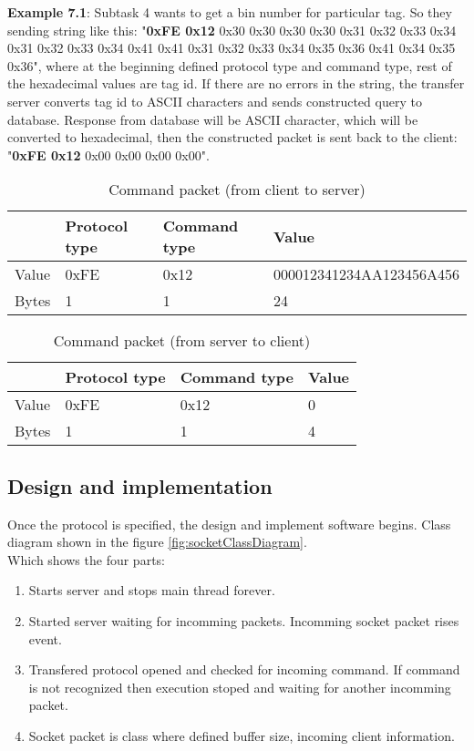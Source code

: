 \textbf{Example 7.1}: Subtask 4 wants to get a bin number for particular tag. So they sending string like this: 
"\textbf{0xFE 0x12} 0x30 0x30 0x30 0x30 0x31 0x32 0x33 0x34 0x31 0x32 0x33 0x34 0x41 0x41 0x31 0x32 0x33 0x34 0x35 0x36 0x41 0x34 0x35 0x36", where at the beginning defined protocol type and command type, rest of the hexadecimal values are tag id. If there are no errors in the string, the transfer server converts tag id to ASCII characters and sends constructed query to database. Response from database will be ASCII character, which will be converted to hexadecimal, then the constructed packet is sent back to the client: "\textbf{0xFE 0x12} 0x00 0x00 0x00 0x00".

\begin{table}[h]
	\centering
    \begin{tabular}{ | p{1cm} | p{3cm} | p{3cm} | p{5cm} |}
    \hline
	& \textbf{Protocol type} & \textbf{Command type} & \textbf{Value}  \\ \hline
	Value & 0xFE & 0x12 & 000012341234AA123456A456 \\ \hline
	Bytes & 1 & 1 & 24  \\ \hline
    \end{tabular}
	\caption{Command packet (from client to server)}
	\label{tab:FromClient}
\end{table}

\begin{table}[h]
	\centering
    \begin{tabular}{ | p{1cm} | p{3cm} | p{3cm} | p{5cm} |}
    \hline
	& \textbf{Protocol type} & \textbf{Command type} & \textbf{Value}  \\ \hline
	Value & 0xFE & 0x12 & 0 \\ \hline
	Bytes & 1 & 1 & 4  \\ \hline
    \end{tabular}
	\caption{Command packet (from server to client)}
	\label{tab:FromServer}
\end{table}

\subsection{Design and implementation}

Once the protocol is specified, the design and implement software begins. Class diagram shown in the figure \ref{fig:socketClassDiagram}. \\ Which shows the four parts:

\begin{enumerate}
	\item Starts server and stops main thread forever.
	\item Started server waiting for incomming packets. Incomming socket packet rises event.
	\item Transfered protocol opened and checked for incoming command. If command is not recognized then execution stoped and waiting for another incomming packet.
	\item Socket packet is class where defined buffer size, incoming client information.
\end{enumerate}

